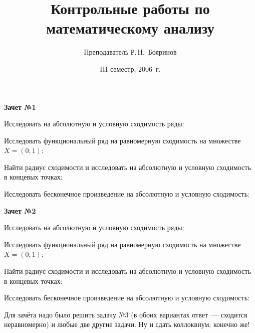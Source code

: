 \documentclass[a4paper,12pt]{article}
\title{Контрольные работы по математическому анализу}
\date{III семестр, 2006~г.}
\author{Преподаватель Р.\,Н.\, Бояринов}
\begin{document}
\maketitle

\centerline{\textbf{Зачет №1}}
\smallskip

Исследовать на абсолютную и условную сходимость ряды:

Исследовать функциональный ряд на равномерную сходимость на
множестве $X=(0,1)$:

Найти радиус сходимости и исследовать на абсолютную
и условную сходимость в концевых точках:

Исследовать бесконечное произведение на абсолютную и условную
сходимость:

\bigskip

\centerline{\textbf{Зачет №2}}
\smallskip

Исследовать на абсолютную и условную сходимость ряды:

Исследовать функциональный ряд на равномерную сходимость на
множестве $X=(0,1)$:

Найти радиус сходимости и исследовать на абсолютную
и условную сходимость в концевых точках:

Исследовать бесконечное произведение на абсолютную и условную
сходимость:

Для зачёта надо было решить задачу №3 (в обоих вариантах ответ~--- сходится неравномерно)
и любые две другие задачи. Ну и сдать
коллоквиум, конечно же!
\medskip
\dmvntrail
\end{document}
